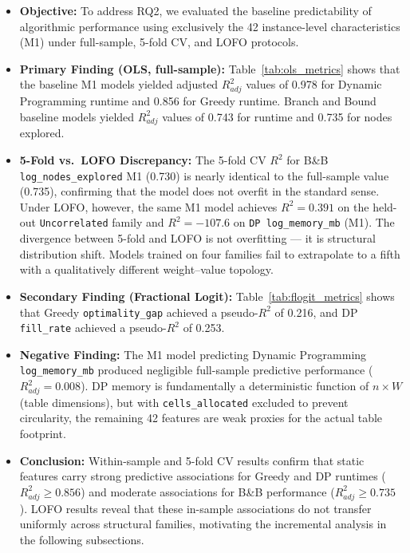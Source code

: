 \documentclass[sigconf]{acmart}
\begin{document}
\begin{itemize}
  \item \textbf{Objective:} To address RQ2, we evaluated the baseline predictability of algorithmic performance using exclusively the 42 instance-level characteristics (M1) under full-sample, 5-fold CV, and LOFO protocols.
  \item \textbf{Primary Finding (OLS, full-sample):} Table~\ref{tab:ols_metrics} shows that the baseline M1 models yielded adjusted $R^2_{adj}$ values of 0.978 for Dynamic Programming runtime and 0.856 for Greedy runtime. Branch and Bound baseline models yielded $R^2_{adj}$ values of 0.743 for runtime and 0.735 for nodes explored.
  \item \textbf{5-Fold vs.\ LOFO Discrepancy:} The 5-fold CV $R^2$ for B\&B \texttt{log\_nodes\_explored} M1 (0.730) is nearly identical to the full-sample value (0.735), confirming that the model does not overfit in the standard sense. Under LOFO, however, the same M1 model achieves $R^2 = 0.391$ on the held-out \texttt{Uncorrelated} family and $R^2 = -107.6$ on \texttt{DP log\_memory\_mb} (M1). The divergence between 5-fold and LOFO is not overfitting --- it is structural distribution shift. Models trained on four families fail to extrapolate to a fifth with a qualitatively different weight--value topology.
  \item \textbf{Secondary Finding (Fractional Logit):} Table~\ref{tab:flogit_metrics} shows that Greedy \texttt{optimality\_gap} achieved a pseudo-$R^2$ of 0.216, and DP \texttt{fill\_rate} achieved a pseudo-$R^2$ of 0.253.
  \item \textbf{Negative Finding:} The M1 model predicting Dynamic Programming \texttt{log\_memory\_mb} produced negligible full-sample predictive performance ($R^2_{adj} = 0.008$). DP memory is fundamentally a deterministic function of $n \times W$ (table dimensions), but with \texttt{cells\_allocated} excluded to prevent circularity, the remaining 42 features are weak proxies for the actual table footprint.
  \item \textbf{Conclusion:} Within-sample and 5-fold CV results confirm that static features carry strong predictive associations for Greedy and DP runtimes ($R^2_{adj} \ge 0.856$) and moderate associations for B\&B performance ($R^2_{adj} \ge 0.735$). LOFO results reveal that these in-sample associations do not transfer uniformly across structural families, motivating the incremental analysis in the following subsections.
\end{itemize}
\end{document}
